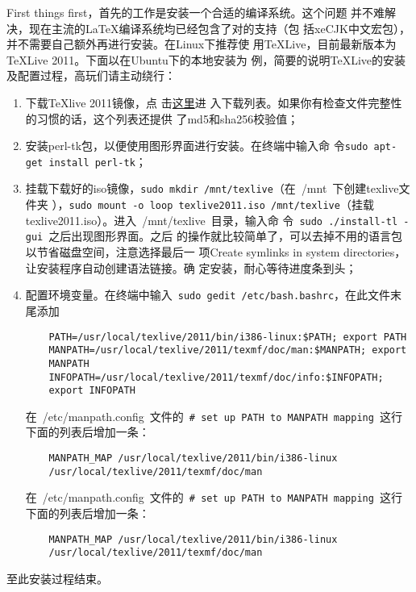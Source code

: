 First things first，首先的工作是安装一个合适的\XeTeX{}编译系统。这个问题
并不难解决，现在主流的\LaTeX{}编译系统均已经包含了对\XeTeX{}的支持（包
括xeCJK中文宏包），并不需要自己额外再进行安装。在Linux下推荐使
用\TeX{}Live，目前最新版本为\TeX{}Live 2011。下面以在Ubuntu下的本地安装为
例，简要的说明\TeX{}Live的安装及配置过程，高玩们请主动绕行：
\begin{enumerate}
\item 下载\TeX{}live 2011镜像，点
  击\href{http://ftp.ctex.org/mirrors/CTAN/systems/texlive/Images/}{这里}进
  入下载列表。如果你有检查文件完整性的习惯的话，这个列表还提供
  了md5和sha256校验值；
\item 安装perl-tk包，以便使用图形界面进行安装。在终端中输入命
  令\texttt{\footnotesize sudo apt-get install perl-tk}；
\item 挂载下载好的iso镜像，\texttt{\footnotesize sudo mkdir
    /mnt/texlive}（在~{/mnt}~下创建texlive文件夹
  ），\texttt{\footnotesize sudo mount -o loop texlive2011.iso
    /mnt/texlive}（挂载texlive2011.iso）。进入~/mnt/texlive~目录，输入命
  令~\texttt{\footnotesize sudo ./install-tl -gui}~之后出现图形界面。之后
  的操作就比较简单了，可以去掉不用的语言包以节省磁盘空间，注意选择最后一
  项Create symlinks in system directories，让安装程序自动创建语法链接。确
  定安装，耐心等待进度条到头；
\item 配置环境变量。在终端中输入~\texttt{\footnotesize sudo gedit
    /etc/bash.bashrc}，在此文件末尾添加
  \begin{lstlisting}
    PATH=/usr/local/texlive/2011/bin/i386-linux:$PATH; export PATH
    MANPATH=/usr/local/texlive/2011/texmf/doc/man:$MANPATH; export
    MANPATH
    INFOPATH=/usr/local/texlive/2011/texmf/doc/info:$INFOPATH;
    export INFOPATH
  \end{lstlisting}
  在~{/etc/manpath.config}~文件的~\texttt{\footnotesize\# set up PATH to
    MANPATH mapping}~这行下面的列表后增加一条：
  \begin{lstlisting}
    MANPATH_MAP /usr/local/texlive/2011/bin/i386-linux
    /usr/local/texlive/2011/texmf/doc/man
  \end{lstlisting}
  在~{/etc/manpath.config}~文件的~\texttt{\footnotesize\# set up PATH to
    MANPATH mapping}~这行下面的列表后增加一条：
  \begin{lstlisting}
    MANPATH_MAP /usr/local/texlive/2011/bin/i386-linux
    /usr/local/texlive/2011/texmf/doc/man
  \end{lstlisting}
\end{enumerate}
至此安装过程结束。


